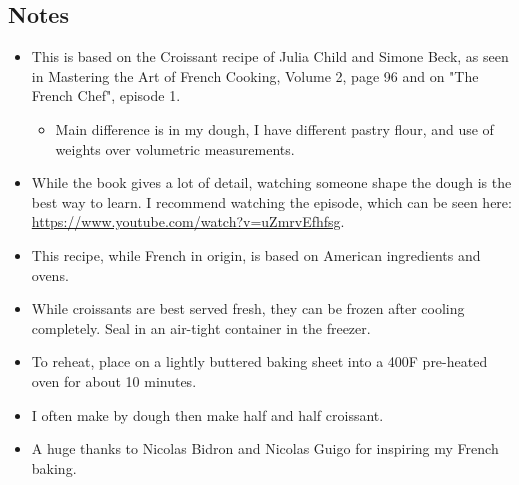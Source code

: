 \begin{multicols}{2}
\begin{enumerate}
\end{enumerate}

\subsection*{Notes}
\begin{itemize}
    \item This is based on the Croissant recipe of Julia Child and Simone Beck, as seen in Mastering the Art of French Cooking, Volume 2, page 96 and on "The French Chef", episode 1. 
    \begin{itemize}
        \item Main difference is in my  dough, I have different pastry flour, and use of weights over volumetric measurements.
    \end{itemize}
    \item While the book gives a lot of detail, watching someone shape the dough is the best way to learn. I recommend watching the episode, which can be seen here: \url{https://www.youtube.com/watch?v=uZmrvEfhfsg}.
    \item This recipe, while French in origin, is based on American ingredients and ovens.
    \item While croissants are best served fresh, they can be frozen after cooling completely. Seal in an air-tight container in the freezer.
    \item To reheat, place on a lightly buttered baking sheet into a 400F pre-heated oven for about 10 minutes.
    \item I often make by dough then make half  and half croissant.
    \item A huge thanks to Nicolas Bidron and Nicolas Guigo for inspiring my French baking.
\end{itemize}
\end{multicols}
\clearpage
